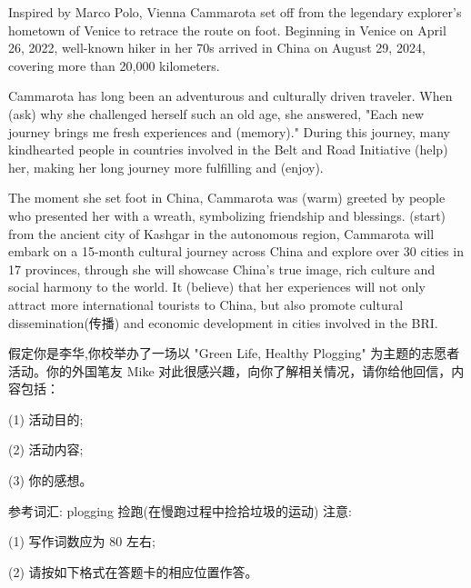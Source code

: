 \documentclass{英语试卷}
\begin{document}
\par Inspired by Marco Polo, Vienna Cammarota set off from the legendary explorer's hometown of Venice to retrace the route on foot. Beginning in Venice on April 26, 2022, \blanknum{} well-known hiker in her 70s arrived in China on August 29, 2024, covering more than 20,000 kilometers.\par
\par Cammarota has long been an adventurous and culturally driven traveler. When  (ask) why she challenged herself  such an old age, she answered, "Each new journey brings me fresh experiences and  (memory)." During this journey, many kindhearted people in countries involved in the Belt and Road Initiative  (help) her, making her long journey more fulfilling and  (enjoy).\par
\par The moment she set foot in China, Cammarota was  (warm) greeted by people who presented her with a wreath, symbolizing friendship and blessings.  (start) from the ancient city of Kashgar in the autonomous region, Cammarota will embark on a 15-month cultural journey across China and explore over 30 cities in 17 provinces, through  she will showcase China's true image, rich culture and social harmony to the world. It  (believe) that her experiences will not only attract more international tourists to China, but also promote cultural dissemination(传播) and economic development in cities involved in the BRI.\par
{}
\par 假定你是李华,你校举办了一场以 "Green Life, Healthy Plogging" 为主题的志愿者活动。你的外国笔友 Mike 对此很感兴趣，向你了解相关情况，请你给他回信，内容包括：\par
\par (1) 活动目的;\par
\par (2) 活动内容;\par
\par (3) 你的感想。\par
\par 参考词汇: plogging 捡跑(在慢跑过程中捡拾垃圾的运动) 注意:\par
\par (1) 写作词数应为 80 左右;\par
\par (2) 请按如下格式在答题卡的相应位置作答。\par
\end{document}
